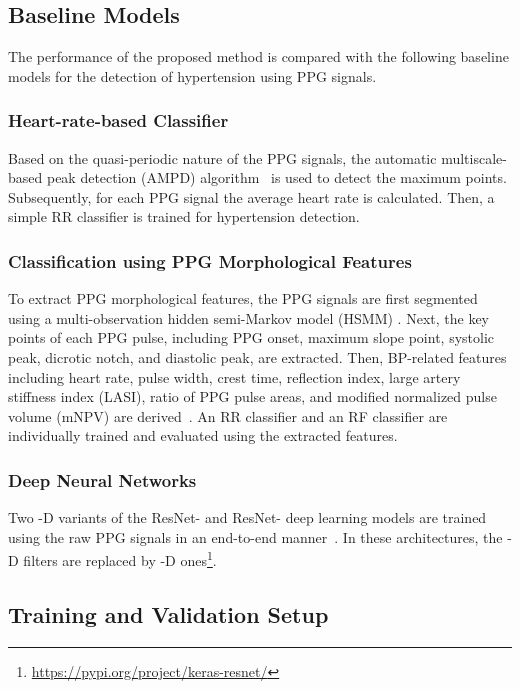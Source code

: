 \documentclass[letterpaper, 10 pt, conference]{ieeeconf}
\begin{document}
\subsection{Baseline Models}
The performance of the proposed method is compared with the following baseline models for the detection of hypertension using PPG signals.

\subsubsection{Heart-rate-based Classifier}
Based on the quasi-periodic nature of the PPG signals, the automatic multiscale-based peak detection (AMPD) algorithm~\cite{scholkmann2012efficient} is used to detect the maximum points. Subsequently, for each PPG signal the average heart rate is calculated. Then, a simple RR classifier is trained for hypertension detection. 


\subsubsection{Classification using PPG Morphological Features}
To extract PPG morphological features, the PPG signals are first segmented using a multi-observation hidden semi-Markov model (HSMM) \cite{hasanzadeh2023multi}. Next, the key points of each PPG pulse, including PPG onset, maximum slope point, systolic peak, dicrotic notch, and diastolic peak, are extracted. Then, BP-related features including heart rate, pulse width, crest time, reflection index, large artery stiffness index (LASI), ratio of PPG pulse areas, and modified normalized pulse volume (mNPV) are derived~\cite{kachuee2016cuffless, hasanzadeh2019blood, wang2023cuffless}.
An RR classifier and an RF classifier are individually trained and evaluated using the extracted features.


\subsubsection{Deep Neural Networks}
Two -D variants of the ResNet- and ResNet- deep learning models are trained using the raw PPG signals in an end-to-end manner~\cite{he2016deep}. In these architectures, the -D filters are replaced by -D ones\footnote{\url{https://pypi.org/project/keras-resnet/}}.

\subsection{Training and Validation Setup}
\end{document}
